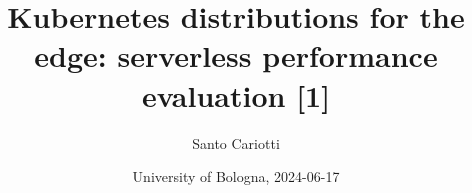 \documentclass{beamer}
\title[Kubernetes distributions for the edge: serverless performance evaluation]{Kubernetes distributions for the edge: serverless performance evaluation \footnotesize{[1]}}
\author[]{Santo Cariotti}
\date[]{University of Bologna, 2024-06-17}
\begin{document}
\frame{\titlepage}









\end{document}
